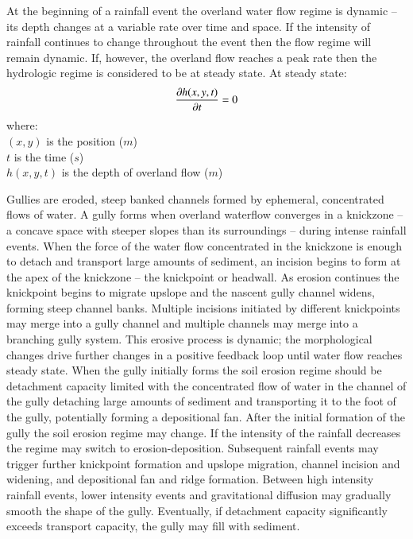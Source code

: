 \documentclass[final,3p,times,twocolumn]{elsarticle}
\begin{document}
At the beginning of a rainfall event 
the overland water flow regime is dynamic -- 
its depth changes at a variable rate over time and space. 
If the intensity of rainfall continues to change throughout the event
then the flow regime will remain dynamic. 
If, however, the overland flow reaches a peak rate
then the hydrologic regime is considered to be at steady state.
At steady state:
\begin{equation}
\label{eq:steady_state}
{\partial h(x,y,t) \over \partial t} = 0 %
\end{equation}
%
{\small
\noindent
where: \\
\noindent
\hspace*{0.5em} $(x,y)$ is the position ($m$)\\
\hspace*{0.5em} $t$ is the time ($s$) \\
\hspace*{0.5em} $h(x,y,t)$ is the depth of overland flow ($m$)\\
}

Gullies are eroded, steep banked channels 
formed by ephemeral, concentrated flows of water.
A gully forms when overland waterflow
converges in a knickzone
-- a concave space with steeper slopes than its surroundings -- 
during intense rainfall events.  
When the force of the water flow concentrated in the knickzone
is enough to detach and transport large amounts of sediment,
an incision begins to form at the apex of the knickzone 
-- the knickpoint or headwall.
As erosion continues the knickpoint begins to migrate upslope
and the nascent gully channel widens,
forming steep channel banks. 
Multiple incisions initiated by different knickpoints 
may merge into a gully channel
and multiple channels may merge into a branching gully system. 
This erosive process is dynamic; 
the morphological changes drive further changes 
in a positive feedback loop
until water flow reaches steady state. 
When the gully initially forms 
the soil erosion regime should be detachment capacity limited
with the concentrated flow of water in the channel of the gully 
detaching large amounts of sediment and transporting it to the foot of the gully, 
potentially forming a depositional fan. 
After the initial formation of the gully
the soil erosion regime may change.
If the intensity of the rainfall decreases
the regime may switch to erosion-deposition. 
Subsequent rainfall events may trigger further 
knickpoint formation and upslope migration, channel incision and widening, and
depositional fan and ridge formation. 
Between high intensity rainfall events, 
lower intensity events and gravitational diffusion
may gradually smooth the shape of the gully. 
Eventually, if detachment capacity significantly exceeds transport capacity, 
the gully may fill with sediment. 
\end{document}

